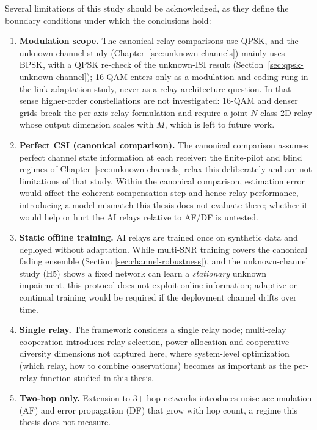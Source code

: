 Several limitations of this study should be acknowledged, as they define the boundary conditions under which the conclusions hold:

\begin{enumerate}
\def\labelenumi{\arabic{enumi}.}
\item
  \textbf{Modulation scope.} The canonical relay comparisons use QPSK, and the unknown-channel study (Chapter~\ref{sec:unknown-channels}) mainly uses BPSK, with a QPSK re-check of the unknown-ISI result (Section~\ref{sec:qpsk-unknown-channel}); 16-QAM enters only as a modulation-and-coding rung in the link-adaptation study, never as a relay-architecture question. In that sense higher-order constellations are not investigated: 16-QAM and denser grids break the per-axis relay formulation and require a joint $N$-class 2D relay whose output dimension scales with $M$, which is left to future work.
\item
  \textbf{Perfect CSI (canonical comparison).} The canonical comparison assumes perfect channel state information at each receiver; the finite-pilot and blind regimes of Chapter~\ref{sec:unknown-channels} relax this deliberately and are not limitations of that study. Within the canonical comparison, estimation error would affect the coherent compensation step and hence relay performance, introducing a model mismatch this thesis does not evaluate there; whether it would help or hurt the AI relays relative to AF/DF is untested.
\item
  \textbf{Static offline training.} AI relays are trained once on synthetic data and deployed without adaptation. While multi-SNR training covers the canonical fading ensemble (Section \ref{sec:channel-robustness}), and the unknown-channel study (H5) shows a fixed network can learn a \emph{stationary} unknown impairment, this protocol does not exploit online information; adaptive or continual training would be required if the deployment channel drifts over time.
\item
  \textbf{Single relay.} The framework considers a single relay node; multi-relay cooperation introduces relay selection, power allocation and cooperative-diversity dimensions not captured here, where system-level optimization (which relay, how to combine observations) becomes as important as the per-relay function studied in this thesis.
\item
  \textbf{Two-hop only.} Extension to 3+-hop networks introduces noise accumulation (AF) and error propagation (DF) that grow with hop count, a regime this thesis does not measure.

\end{enumerate}

